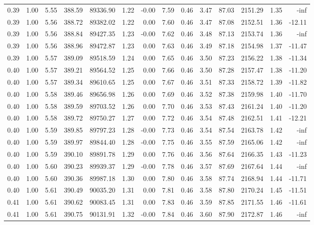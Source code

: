 \begin{table}[!ht]
\begin{tabular}{rrrrrrrrrrrrrr}
0.39 & 1.00 & 5.55 & 388.59 & 89336.90 & 1.22 & -0.00 & 7.59 & 0.46 & 3.47 & 87.03 & 2151.29 & 1.35 & -inf \\
0.39 & 1.00 & 5.56 & 388.72 & 89382.02 & 1.22 & 0.00 & 7.60 & 0.46 & 3.47 & 87.08 & 2152.51 & 1.36 & -12.11 \\
0.39 & 1.00 & 5.56 & 388.84 & 89427.35 & 1.23 & -0.00 & 7.62 & 0.46 & 3.48 & 87.13 & 2153.74 & 1.36 & -inf \\
0.39 & 1.00 & 5.56 & 388.96 & 89472.87 & 1.23 & 0.00 & 7.63 & 0.46 & 3.49 & 87.18 & 2154.98 & 1.37 & -11.47 \\
0.39 & 1.00 & 5.57 & 389.09 & 89518.59 & 1.24 & 0.00 & 7.65 & 0.46 & 3.50 & 87.23 & 2156.22 & 1.38 & -11.34 \\
0.40 & 1.00 & 5.57 & 389.21 & 89564.52 & 1.25 & 0.00 & 7.66 & 0.46 & 3.50 & 87.28 & 2157.47 & 1.38 & -11.20 \\
0.40 & 1.00 & 5.57 & 389.34 & 89610.65 & 1.25 & 0.00 & 7.67 & 0.46 & 3.51 & 87.33 & 2158.72 & 1.39 & -11.82 \\
0.40 & 1.00 & 5.58 & 389.46 & 89656.98 & 1.26 & 0.00 & 7.69 & 0.46 & 3.52 & 87.38 & 2159.98 & 1.40 & -11.70 \\
0.40 & 1.00 & 5.58 & 389.59 & 89703.52 & 1.26 & 0.00 & 7.70 & 0.46 & 3.53 & 87.43 & 2161.24 & 1.40 & -11.20 \\
0.40 & 1.00 & 5.58 & 389.72 & 89750.27 & 1.27 & 0.00 & 7.72 & 0.46 & 3.54 & 87.48 & 2162.51 & 1.41 & -12.21 \\
0.40 & 1.00 & 5.59 & 389.85 & 89797.23 & 1.28 & -0.00 & 7.73 & 0.46 & 3.54 & 87.54 & 2163.78 & 1.42 & -inf \\
0.40 & 1.00 & 5.59 & 389.97 & 89844.40 & 1.28 & -0.00 & 7.75 & 0.46 & 3.55 & 87.59 & 2165.06 & 1.42 & -inf \\
0.40 & 1.00 & 5.59 & 390.10 & 89891.78 & 1.29 & 0.00 & 7.76 & 0.46 & 3.56 & 87.64 & 2166.35 & 1.43 & -11.23 \\
0.40 & 1.00 & 5.60 & 390.23 & 89939.37 & 1.29 & -0.00 & 7.78 & 0.46 & 3.57 & 87.69 & 2167.64 & 1.44 & -inf \\
0.40 & 1.00 & 5.60 & 390.36 & 89987.18 & 1.30 & 0.00 & 7.80 & 0.46 & 3.58 & 87.74 & 2168.94 & 1.44 & -11.71 \\
0.40 & 1.00 & 5.61 & 390.49 & 90035.20 & 1.31 & 0.00 & 7.81 & 0.46 & 3.58 & 87.80 & 2170.24 & 1.45 & -11.51 \\
0.41 & 1.00 & 5.61 & 390.62 & 90083.45 & 1.31 & 0.00 & 7.83 & 0.46 & 3.59 & 87.85 & 2171.55 & 1.46 & -11.61 \\
0.41 & 1.00 & 5.61 & 390.75 & 90131.91 & 1.32 & -0.00 & 7.84 & 0.46 & 3.60 & 87.90 & 2172.87 & 1.46 & -inf \\

\end{tabular}
\end{table}

